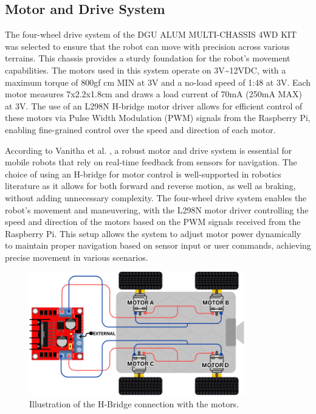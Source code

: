 \subsection{Motor and Drive System}

The four-wheel drive system of the DGU ALUM MULTI-CHASSIS 4WD KIT was selected to ensure that the robot can move with precision across various terrains. This chassis provides a sturdy foundation for the robot's movement capabilities. The motors used in this system operate on 3V\textasciitilde12VDC, with a maximum torque of 800gf cm MIN at 3V and a no-load speed of 1:48 at 3V. Each motor measures 7x2.2x1.8cm and draws a load current of 70mA (250mA MAX) at 3V. The use of an L298N H-bridge motor driver allows for efficient control of these motors via Pulse Width Modulation (PWM) signals from the Raspberry Pi, enabling fine-grained control over the speed and direction of each motor.

According to Vanitha et al. \cite{vanitha2016}, a robust motor and drive system is essential for mobile robots that rely on real-time feedback from sensors for navigation. The choice of using an H-bridge for motor control is well-supported in robotics literature as it allows for both forward and reverse motion, as well as braking, without adding unnecessary complexity. The four-wheel drive system enables the robot's movement and maneuvering, with the L298N motor driver controlling the speed and direction of the motors based on the PWM signals received from the Raspberry Pi. This setup allows the system to adjust motor power dynamically to maintain proper navigation based on sensor input or user commands, achieving precise movement in various scenarios.

\begin{figure}[H]
	\centering

		\centering
		\includegraphics[width=0.835\textwidth]{ch4/figs/H-Bridge-Interface.png}
		\caption{Illustration of the H-Bridge connection with the motors.}
		\label{fig:motor_H-bridge_connection}
	\end{figure}


